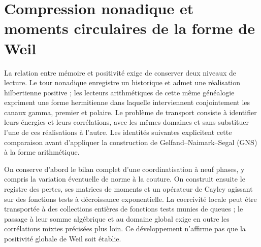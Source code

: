 \clearpage
\section[Compression nonadique et moments circulaires de la forme de Weil]{Compression nonadique et\\moments circulaires de la forme de Weil}
\label{sec:transporte-momentos}
\label{tm-add-seccion}

La relation entre mémoire et positivité exige de conserver deux niveaux de lecture. Le tour nonadique enregistre un historique et admet une réalisation hilbertienne positive ; les lecteurs arithmétiques de cette même généalogie expriment une forme hermitienne dans laquelle interviennent conjointement les canaux gamma, premier et polaire. Le problème de transport consiste à identifier leurs énergies et leurs corrélations, avec les mêmes domaines et sans substituer l'une de ces réalisations à l'autre. Les identités suivantes explicitent cette comparaison avant d'appliquer la construction de Gelfand--Naimark--Segal (GNS) à la forme arithmétique.

On conserve d'abord le bilan complet d'une coordinatisation à neuf phases, y compris la variation éventuelle de norme à la couture. On construit ensuite le registre des pertes, ses matrices de moments et un opérateur de Cayley agissant sur des fonctions tests à décroissance exponentielle. La coercivité locale peut être transportée à des collections entières de fonctions tests munies de queues ; le passage à leur somme algébrique et au domaine global exige en outre les corrélations mixtes précisées plus loin. Ce développement n'affirme pas que la positivité globale de Weil soit établie.

% 
% 
% 
% 

